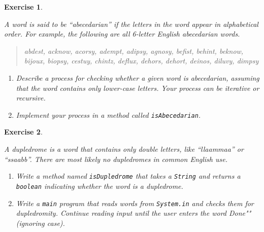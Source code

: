 \documentclass[12pt]{book}
\theoremstyle{exercise}
\newtheorem{exercise}{Exercise}[chapter]
\newcommand{\java}[1]{\verb"#1"}
\newcommand{\java}[1]{\lstinline{#1}} %
\begin{document}
\begin{exercise}
\label{abecedarian}

A word is said to be ``abecedarian'' if the letters in the word appear in alphabetical order.
For example, the following are all 6-letter English abecedarian words.

\begin{quote}
abdest, acknow, acorsy, adempt, adipsy, agnosy, befist, behint,
beknow, bijoux, biopsy, cestuy, chintz, deflux, dehors, dehort,
deinos, diluvy, dimpsy
\end{quote}

\begin{enumerate}

\item Describe a process for checking whether a given word is abecedarian, assuming that the word contains only lower-case
letters.
Your process can be iterative or recursive.

\item Implement your process in a method called \java{isAbecedarian}.

\end{enumerate}

\end{exercise}


\begin{exercise}
\label{dupledrome}

A dupledrome is a word that contains only double letters, like ``llaammaa'' or ``ssaabb''.
There are most likely no dupledromes in common English use.

\begin{enumerate}

\item Write a method named \java{isDupledrome} that takes a \java{String} and returns a \java{boolean} indicating whether the word is a dupledrome.

\item Write a \java{main} program that reads words from \java{System.in} and checks them for dupledromity.
Continue reading input until the user enters the word \java{"Done"} (ignoring case).

\end{enumerate}

\end{exercise}
\end{document}
